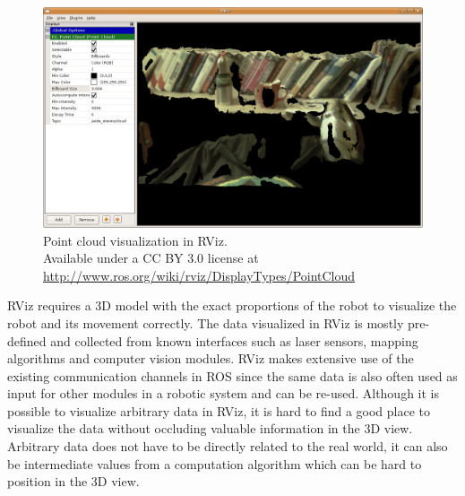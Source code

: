 \begin{figure}[htbp]
  \centering
  \includegraphics[scale=0.3]{img/RVizPointCloud.png}
  \caption{Point cloud visualization in RViz.\\Available under a CC BY 3.0 license at \url{http://www.ros.org/wiki/rviz/DisplayTypes/PointCloud}}
  \label{rviz_pcl}
\end{figure}




RViz requires a 3D model with the exact proportions of the robot to visualize the robot and its movement correctly. The data visualized in RViz is mostly pre-defined and collected from known interfaces such as laser sensors, mapping algorithms and computer vision modules. RViz makes extensive use of the existing communication channels in ROS since the same data is also often used as input for other modules in a robotic system and can be re-used. Although it is possible to visualize arbitrary data in RViz, it is hard to find a good place to visualize the data without occluding valuable information in the 3D view. Arbitrary data does not have to be directly related to the real world, it can also be intermediate values from a computation algorithm which can be hard to position in the 3D view.

